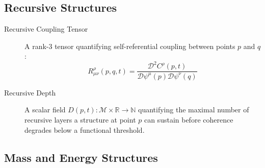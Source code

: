 
\subsection{Recursive Structures}
\label{1.1.3:recursive_structures}

\begin{description}

\item[Recursive Coupling Tensor] A rank-3 tensor quantifying self-referential coupling between points \(p\) and \(q\):
\begin{equation}
R^\rho_{\mu\nu}(p,q,t) = \frac{\mathcal{D}^2 C^\rho(p,t)}{\mathcal{D} \psi^\mu(p) \mathcal{D} \psi^\nu(q)}
\end{equation}

\item[Recursive Depth] A scalar field \(D(p,t) : \mathcal{M} \times \mathbb{R} \rightarrow \mathbb{N}\) quantifying the maximal number of recursive layers a structure at point \(p\) can sustain before coherence degrades below a functional threshold.

\end{description}


\subsection{Mass and Energy Structures}
\label{1.1.4:mass_and_energy_structures}

